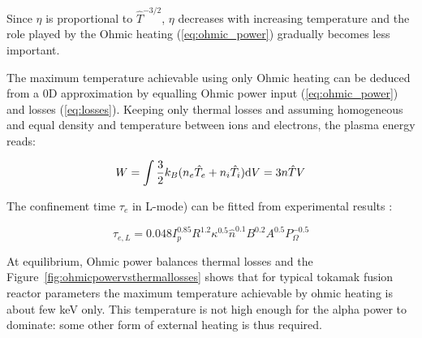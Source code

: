 Since $\eta$ is proportional to $\hat T^{-3/2}$, $\eta$ decreases with increasing temperature and the role played by the Ohmic heating (\ref{eq:ohmic_power}) gradually becomes less important. 


The maximum temperature achievable using only Ohmic heating can be deduced from a 0D approximation by equalling Ohmic power input (\ref{eq:ohmic_power}) and losses (\ref{eq:losses}). Keeping only thermal losses and assuming homogeneous and equal density and temperature between ions and electrons, the plasma energy reads: 

\begin{equation}\label{eq:plasma_energy}
W 
= \int \frac{3}{2} k_B (n_e \hat T_e + n_i \hat T_i) {\mathrm{d}} V 
=
 3 n \hat{T} V
\end{equation}

The confinement time $\tau_e$ in L-mode) can be fitted from experimental results \cite[Eq.(14.155)]{Freidberg2007}:

\begin{equation}\label{eq:tau_e_modeL}
\tau_{e,L}
=
0.048  I_p^{0.85} R^{1.2} \kappa^{0.5} \hat n^{0.1} B^{0.2} A^{0.5} P_\Omega^{-0.5}
\end{equation}  

At equilibrium, Ohmic power balances thermal losses and the Figure~\ref{fig:ohmicpowervsthermallosses} shows that for typical tokamak fusion reactor parameters
the maximum temperature achievable by ohmic heating is about few keV only. This temperature is not high enough for the alpha power to dominate: some other form of external heating is thus required. 


